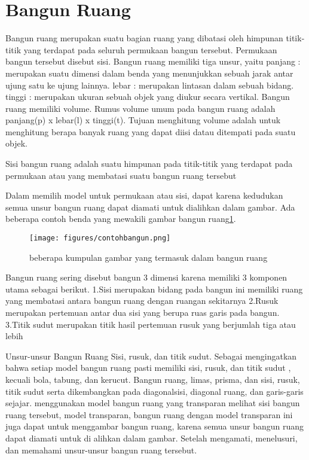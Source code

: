 	
\section{Bangun Ruang}
Bangun ruang merupakan suatu bagian ruang yang dibatasi oleh himpunan titik-titik yang terdapat pada seluruh permukaan bangun tersebut. 
Permukaan bangun tersebut disebut sisi. Bangun ruang memiliki tiga unsur, yaitu 
panjang : merupakan suatu dimensi dalam benda yang menunjukkan sebuah jarak antar ujung satu ke ujung lainnya.
lebar   : merupakan lintasan dalam sebuah bidang.
tinggi  : merupakan ukuran sebuah objek yang diukur secara vertikal.
Bangun ruang memiliki volume. Rumus volume umum pada bangun ruang adalah panjang(p) x lebar(l) x tinggi(t).
Tujuan menghitung volume adalah untuk menghitung berapa banyak ruang yang dapat diisi datau ditempati pada suatu objek.

Sisi bangun ruang adalah suatu himpunan pada titik-titik yang terdapat pada permukaan atau yang membatasi suatu bangun ruang tersebut \cite{umami2013eksperimentasi}

Dalam memilih model untuk permukaan atau sisi, dapat karena kedudukan semua unsur bangun ruang dapat diamati untuk dialihkan dalam gambar\cite{suharjana2008mengenal}. 
Ada beberapa contoh benda yang mewakili gambar bangun ruang\ref{contohbangun}.
\begin{figure}[ht]
    \centerline{\texttt{[image: figures/contohbangun.png]}}
    \caption{beberapa kumpulan gambar yang termasuk dalam bangun ruang}
    \label{contohbangun}
    \end{figure}
 
Bangun ruang sering  disebut bangun 3 dimensi karena memiliki 3 komponen utama sebagai berikut.
1.Sisi  merupakan bidang pada bangun ini memiliki ruang yang membatasi antara bangun ruang dengan ruangan sekitarnya 
2.Rusuk merupakan pertemuan antar dua sisi yang berupa ruas garis pada bangun.
3.Titik sudut merupakan titik hasil pertemuan rusuk yang berjumlah tiga atau lebih

Unsur-unsur Bangun Ruang Sisi, rusuk, dan titik sudut. Sebagai mengingatkan bahwa setiap model bangun ruang pasti memiliki sisi, rusuk, dan titik sudut , kecuali bola, tabung, dan kerucut.
Bangun ruang, limas, prisma, dan sisi, rusuk, titik sudut serta dikembangkan pada diagonalsisi, diagonal ruang, dan garis-garis sejajar.
menggunakan model bangun ruang yang transparan  melihat sisi bangun ruang tersebut, model transparan, bangun ruang dengan model transparan ini juga dapat untuk menggambar bangun ruang, karena semua unsur bangun ruang dapat diamati untuk di alihkan dalam gambar. Setelah mengamati, 
menelusuri, dan memahami unsur-unsur bangun ruang tersebut.

